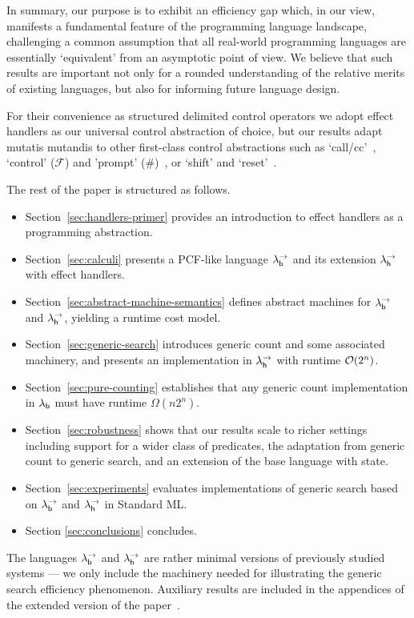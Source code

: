 \documentclass[12pt,phd,lfcs,twoside,openright,logo,leftchapter,normalheadings]{infthesis}
\theoremstyle{plain}
\theoremstyle{definition}
\begin{document}
In summary, our purpose is to exhibit an efficiency gap which, in our
view, manifests a fundamental feature of the programming language
landscape, challenging a common assumption that all real-world
programming languages are essentially `equivalent' from an asymptotic
point of view.  We believe that such results are important not only
for a rounded understanding of the relative merits of existing
languages, but also for informing future language design.

For their convenience as structured delimited control operators we
adopt effect handlers as our universal control abstraction of choice,
but our results adapt mutatis mutandis to other first-class control
abstractions such as `call/cc'~\cite{AbelsonHAKBOBPCRFRHSHW85}, `control'
($\mathcal{F}$) and 'prompt' ($\textbf{\#}$)~\citep{Felleisen88}, or
`shift' and `reset'~\citep{DanvyF90}.

The rest of the paper is structured as follows.
\begin{itemize}
 \item Section~\ref{sec:handlers-primer} provides an introduction to
   effect handlers as a programming abstraction.
 \item Section~\ref{sec:calculi} presents a PCF-like language
   $\lambda^\rightarrow_{\mathsf{b}}$ and its extension $\lambda^\rightarrow_{\mathsf{h}}$ with effect handlers.
 \item Section~\ref{sec:abstract-machine-semantics} defines abstract
   machines for $\lambda^\rightarrow_{\mathsf{b}}$ and $\lambda^\rightarrow_{\mathsf{h}}$, yielding a runtime cost model.
 \item Section~\ref{sec:generic-search} introduces generic count and
   some associated machinery, and presents an implementation in
   $\lambda^\rightarrow_{\mathsf{h}}$ with runtime $\mathcal{O}(2^n)$.
 \item Section~\ref{sec:pure-counting} establishes that any generic
   count implementation in $\lambda_{\mathsf{b}}$ must have runtime $\Omega(n2^n)$.
 \item Section~\ref{sec:robustness} shows that our results scale to
   richer settings including support for a wider class of predicates,
   the adaptation from generic count to generic search, and an
   extension of the base language with state.
 \item Section~\ref{sec:experiments} evaluates implementations of
   generic search based on $\lambda^\rightarrow_{\mathsf{b}}$ and $\lambda^\rightarrow_{\mathsf{h}}$ in Standard ML.
 \item Section \ref{sec:conclusions} concludes.
\end{itemize}
%
The languages $\lambda^\rightarrow_{\mathsf{b}}$ and $\lambda^\rightarrow_{\mathsf{h}}$ are rather minimal versions of
previously studied systems --- we only include the machinery needed
for illustrating the generic search efficiency phenomenon.
%
Auxiliary results are included in the appendices of the extended
version of the paper~\citep{HillerstromLL20}.
\end{document}
